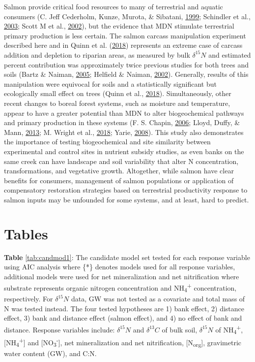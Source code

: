 \documentclass [11pt, proquest] {uwthesis}[2015/03/03]
\begin{document}
Salmon provide critical food resources to many of terrestrial and
aquatic consumers (C. Jeff Cederholm, Kunze, Murota, \& Sibatani,
\protect\hyperlink{ref-Cederholm1999}{1999}; Schindler et al.,
\protect\hyperlink{ref-Schindler2003}{2003}; Scott M et al.,
\protect\hyperlink{ref-Gende2002}{2002}), but the evidence that MDN
stimulate terrestrial primary production is less certain. The salmon
carcass manipulation experiment described here and in Quinn et al.
(\protect\hyperlink{ref-Quinn2018}{2018}) represents an extreme case of
carcass addition and depletion to riparian areas, as measured by bulk
\(\delta^{15}N\) and estimated percent contribution was approximately
twice previous studies for both trees and soils (Bartz \& Naiman,
\protect\hyperlink{ref-Bartz2005}{2005}; Helfield \& Naiman,
\protect\hyperlink{ref-Helfield2002}{2002}). Generally, results of this
manipulation were equivocal for soils and a statistically significant
but ecologically small effect on trees (Quinn et al.,
\protect\hyperlink{ref-Quinn2018}{2018}). Simultaneously, other recent
changes to boreal forest systems, such as moisture and temperature,
appear to have a greater potential than MDN to alter biogeochemical
pathways and primary production in these systems (F. S. Chapin,
\protect\hyperlink{ref-Chapin2006}{2006}; Lloyd, Duffy, \& Mann,
\protect\hyperlink{ref-Lloyd2013}{2013}; M. Wright et al.,
\protect\hyperlink{ref-Wright2018}{2018}; Yarie,
\protect\hyperlink{ref-Yarie2008}{2008}). This study also demonstrates
the importance of testing biogeochemical and site similarity between
experimental and control sites in nutrient subsidy studies, as even
banks on the same creek can have landscape and soil variability that
alter N concentration, transformations, and vegetative growth.
Altogether, while salmon have clear benefits for consumers, management
of salmon populations or application of compensatory restoration
strategies based on terrestrial productivity response to salmon inputs
may be unfounded for some systems, and at least, hard to predict.

\section{Tables}\label{tables}

\textbf{Table} \ref{tab:candmod1}: The candidate model set tested for
each response variable using AIC analysis where \{*\} denotes models
used for all response variables, additional models were used for net
mineralization and net nitrification where substrate represents organic
nitrogen concentration and NH\textsubscript{4}\textsuperscript{+}
concentration, respectively. For \(\delta^{15}N\) data, GW was not
tested as a covariate and total mass of N was tested instead. The four
tested hypotheses are 1) bank effect, 2) distance effect, 3) bank and
distance effect (salmon effect), and 4) no effect of bank and distance.
Response variables include: \(\delta^{15}N\) and \(\delta^{13}C\) of
bulk soil, \(\delta^{15}N\) of NH\textsubscript{4}\textsuperscript{+},
{[}NH\textsubscript{4}\textsuperscript{+}{]} and
{[}NO\textsubscript{3}\textsuperscript{-}{]}, net mineralization and net
nitrification, {[}N\textsubscript{org}{]}, gravimetric water content
(GW), and C:N.
\end{document}

